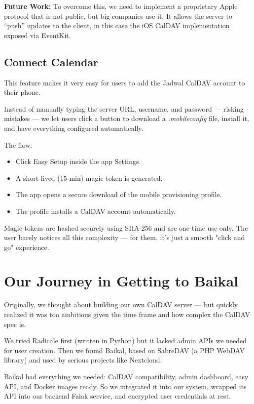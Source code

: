 \textbf{Future Work:} To overcome this, we need to implement a proprietary Apple protocol that is not public, but big companies use it. It allows the server to ``push'' updates to the client, in this case the iOS CalDAV implementation exposed via EventKit.

\subsection{Connect Calendar} \label{subsec:connect-calendar}

This feature makes it very easy for users to add the Jadwal CalDAV account to their phone.

Instead of manually typing the server URL, username, and password — risking mistakes — we let users click a button to download a \textit{.mobileconfig} file, install it, and have everything configured automatically.

The flow:

\begin{itemize}
    \item Click Easy Setup inside the app Settings.
    \item A short-lived (15-min) magic token is generated.
    \item The app opens a secure download of the mobile provisioning profile.
    \item The profile installs a CalDAV account automatically.
\end{itemize}

Magic tokens are hashed securely using SHA-256 and are one-time use only. The user barely notices all this complexity — for them, it’s just a smooth "click and go" experience.

\section{Our Journey in Getting to Baikal}

Originally, we thought about building our own CalDAV server — but quickly realized it was too ambitious given the time frame and how complex the CalDAV spec is.

We tried Radicale first (written in Python) but it lacked admin APIs we needed for user creation. Then we found Baikal, based on SabreDAV (a PHP WebDAV library) and used by serious projects like Nextcloud.

Baikal had everything we needed: CalDAV compatibility, admin dashboard, easy API, and Docker images ready. So we integrated it into our system, wrapped its API into our backend Falak service, and encrypted user credentials at rest.

